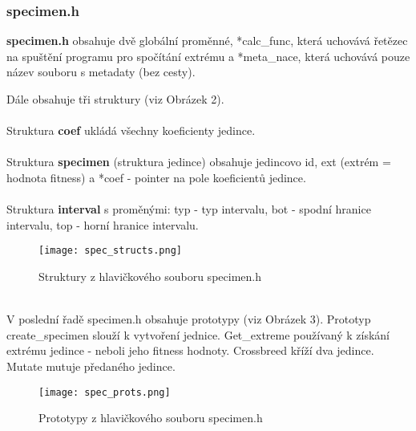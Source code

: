 \documentclass[11pt, a4paper]{article}
\begin{document}
\subsubsection{specimen.h}
\textbf{specimen.h} obsahuje dvě globální proměnné, *calc\_func, která uchovává řetězec na spuštění programu pro spočítání extrému a *meta\_nace, která uchovává pouze název souboru s metadaty (bez cesty).\par
Dále obsahuje tři struktury (viz Obrázek 2).\\\\Struktura \textbf{coef} ukládá všechny koeficienty jedince.\\\\Struktura \textbf{specimen} (struktura jedince) obsahuje jedincovo id, ext (extrém = hodnota fitness) a *coef - pointer na pole koeficientů jedince.\\\\Struktura \textbf{interval} s proměnými: typ - typ intervalu, bot - spodní hranice intervalu, top - horní hranice intervalu.
\begin{figure}[h]
  \texttt{[image: spec\_structs.png]}
  \caption{Struktury z hlavičkového souboru specimen.h}
  \label{fig:specimen_structs}
\end{figure}\\
V poslední řadě specimen.h obsahuje prototypy (viz Obrázek 3). Prototyp create\_specimen slouží k vytvoření jednice. Get\_extreme používaný k získání extrému jedince - neboli jeho fitness hodnoty. Crossbreed kříží dva jedince. Mutate mutuje předaného jedince.
\begin{figure}[h]
  \texttt{[image: spec\_prots.png]}
  \caption{Prototypy z hlavičkového souboru specimen.h}
  \label{fig:specimen_prots}
\end{figure}\\
\end{document}
